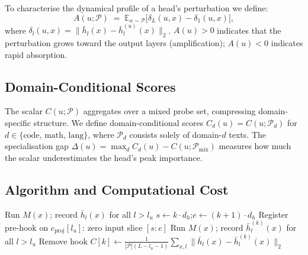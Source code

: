 \documentclass[11pt,a4paper]{article}
\newcommand{\E}{\mathbb{E}}
\newcommand{\hb}{\bar{h}}
\theoremstyle{definition}
\theoremstyle{plain}
\begin{document}
To characterise the dynamical profile of a head's perturbation we define:
\begin{equation}
    A(u;\mathcal{P}) \;=\;
    \E_{x \sim \mathcal{P}}\!\bigl[
        \delta_L(u,x) - \delta_1(u,x)
    \bigr],
    \label{eq:amp}
\end{equation}
where $\delta_l(u,x) = \|\hb_l(x) - \hb_l^{(u)}(x)\|_2$.
$A(u) > 0$ indicates that the perturbation grows toward the output layers
(amplification); $A(u) < 0$ indicates rapid absorption.

\subsection{Domain-Conditional Scores}
\label{sec:domain_def}

The scalar $C(u;\mathcal{P})$ aggregates over a mixed probe set, compressing
domain-specific structure.
We define domain-conditional scores $C_d(u) = C(u;\mathcal{P}_d)$ for
$d \in \{\text{code, math, lang}\}$, where $\mathcal{P}_d$ consists solely
of domain-$d$ texts.
The specialisation gap $\Delta(u) = \max_d C_d(u) - C(u;\mathcal{P}_{\text{mix}})$
measures how much the scalar underestimates the head's peak importance.

\subsection{Algorithm and Computational Cost}

\begin{algorithm}[t]
\caption{Compute $C(u;\mathcal{P})$ for all heads at layer $l_u$}
\label{alg:bridge}
\begin{algorithmic}[1]
    \State Run $M(x)$; record $\hb_l(x)$ for all $l > l_u$ 
\EndFor
{}
    \State $s \gets k \cdot d_h$;\quad $e \gets (k+1)\cdot d_h$
    \State Register pre-hook on $c_{\text{proj}}[l_u]$: zero input slice $[s:e]$
        \State Run $M(x)$; record $\hb_l^{(k)}(x)$ for all $l > l_u$
    \EndFor
    \State Remove hook
    \State $C[k] \gets \frac{1}{|\mathcal{P}|(L-l_u-1)}
              \displaystyle\sum_{x,l}\bigl\|\hb_l(x)-\hb_l^{(k)}(x)\bigr\|_2$
\EndFor
\State {}
\end{algorithmic}
\end{algorithm}
\end{document}
